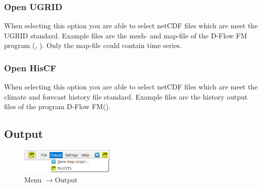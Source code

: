 \documentclass{deltares_memo}
\newcommand{\menuarrow}{$\rightarrow$}
\newcommand{\dflowfm}{D-Flow FM\xspace}
\newcommand{\netcdf}{netCDF\xspace}
\begin{document}
\subsubsection{Open UGRID}
When selecting this option you are able to select \netcdf files which are meet the UGRID standard. 
Example files are the mesh- and map-file of the \dflowfm program (, ).
Only the map-file could contain time series.
\subsubsection{Open HisCF}
When selecting this option you are able to select \netcdf files which are meet the climate and forecast history file standard.
Example files are the history output files of the program \dflowfm ().
\subsection{Output}
\phantom{m}\vspace{-\baselineskip}
\begin{figure}[H]
    \centering    
    \includegraphics[width=0.40\textwidth]{pictures/menu_output.png}
    \caption{Menu \menuarrow Output}
\end{figure}

\end{document}
